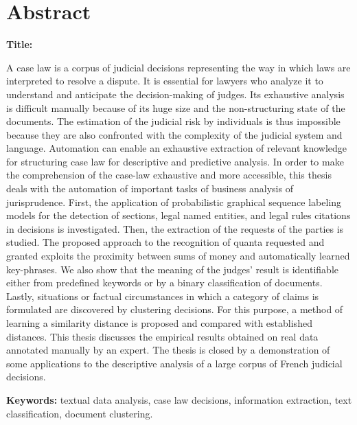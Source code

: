 \chapter*{Abstract}
\textbf{Title:} \textsc{\titleen}

A case law is a corpus of judicial decisions representing the way in which laws are interpreted to resolve a dispute. It is essential for lawyers who analyze it to understand and anticipate the decision-making of judges. Its exhaustive analysis is difficult manually because of its huge size and the non-structuring state of the documents. The estimation of the judicial risk by individuals is thus impossible because they are also confronted with the complexity of the judicial system and language. Automation can enable an exhaustive extraction of relevant knowledge for structuring case law for descriptive and predictive analysis.
In order to make the comprehension of the case-law exhaustive and more accessible, this thesis deals with the automation of important tasks of business analysis of jurisprudence. First, the application of probabilistic graphical sequence labeling models for the detection of sections, legal named entities, and legal rules citations in decisions is investigated. Then, the extraction of the requests of the parties is studied. The proposed approach to the recognition of quanta requested and granted exploits the proximity between sums of money and automatically learned key-phrases. We also show that the meaning of the judges' result is identifiable either from predefined keywords or by a binary classification of documents. Lastly, situations or factual circumstances in which a category of claims is formulated are discovered by clustering decisions. For this purpose, a method of learning a similarity distance is proposed and compared with established distances.
This thesis discusses the empirical results obtained on real data annotated manually by an expert. The thesis is closed by a demonstration of some applications to the descriptive analysis of a large corpus of French judicial decisions.

\textbf{Keywords:} textual data analysis, case law decisions, information extraction, text classification, document clustering.

